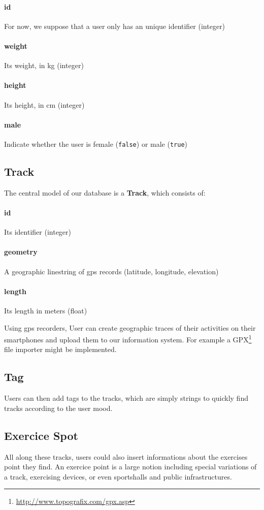 \documentclass[a4paper]{article}
\begin{document}
\paragraph{id} For now, we suppose that a user only has an unique identifier (integer)
\paragraph{weight} Its weight, in kg (integer)
\paragraph{height} Its height, in cm (integer)
\paragraph{male} Indicate whether the user is female (\texttt{false}) or male (\texttt{true})


\subsection{Track}
The central model of our database is a \textbf{Track}, which consists of:

\paragraph{id} Its identifier (integer)
\paragraph{geometry} A geographic linestring of gps records (latitude, longitude, elevation)
\paragraph{length} Its length in meters (float)

Using gps recorders, User can create geographic traces of their activities on
their smartphones and upload them to our information system. For example a GPX\footnote{\url{http://www.topografix.com/gpx.asp}}
file importer might be implemented.


\subsection{Tag}
Users can then add tags to the tracks, which are simply strings to quickly find
tracks according to the user mood.


\subsection{Exercice Spot}
All along these tracks, users could also insert informations about the exercises
point they find. An exercice point is a large notion including special variations
of a track, exercising devices, or even sportshalls and public infrastructures.
\end{document}
